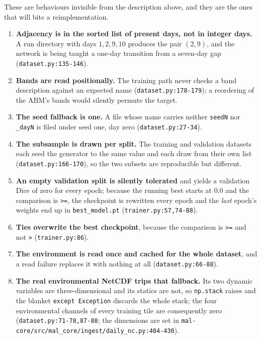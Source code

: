 \documentclass[11pt,a4paper]{article}
\newcommand{\codex}[1]{\texttt{#1}}
\begin{document}
These are behaviours invisible from the description above, and they are the
ones that will bite a reimplementation.

\begin{enumerate}
\item \textbf{Adjacency is in the sorted list of present days, not in
      integer days.} A run directory with days \(1,2,9,10\) produces the
      pair \((2,9)\), and the network is being taught a one-day transition
      from a seven-day gap (\codex{dataset.py:135-146}).
\item \textbf{Bands are read positionally.} The training path never checks a
      band description against an expected name
      (\codex{dataset.py:178-179}); a reordering of the ABM's bands would
      silently permute the target.
\item \textbf{The seed fallback is one.} A file whose name carries neither
      \codex{seedN} nor \codex{\_\allowbreak{}dayN} is filed under seed one, day zero
      (\codex{dataset.py:27-34}).
\item \textbf{The subsample is drawn per split.} The training and validation
      datasets each seed the generator to the same value and each draw from
      their own list (\codex{dataset.py:166-170}), so the two subsets are
      reproducible but different.
\item \textbf{An empty validation split is silently tolerated} and yields a
      validation Dice of zero for every epoch; because the running best
      starts at \(0.0\) and the comparison is \codex{>=}, the checkpoint is
      rewritten every epoch and the \emph{last} epoch's weights end up in
      \codex{best\_\allowbreak{}model.pt}
      (\codex{trainer.py:57,74-88}).
\item \textbf{Ties overwrite the best checkpoint}, because the comparison is
      \codex{>=} and not \codex{>} (\codex{trainer.py:86}).
\item \textbf{The environment is read once and cached for the whole
      dataset}, and a read failure replaces it with nothing at all
      (\codex{dataset.py:66-88}).
\item \textbf{The real environmental NetCDF trips that fallback.} Its two
      dynamic variables are three-dimensional and its statics are not, so
      \codex{np.stack} raises and the blanket \codex{except Exception}
      discards the whole stack; the four environmental channels of every
      training tile are consequently zero
      (\codex{dataset.py:71-78,87-88}; the dimensions are set in
      \codex{mal-core/src/mal\_core/ingest/daily\_nc.py:404-430}).

\end{enumerate}
\end{document}
